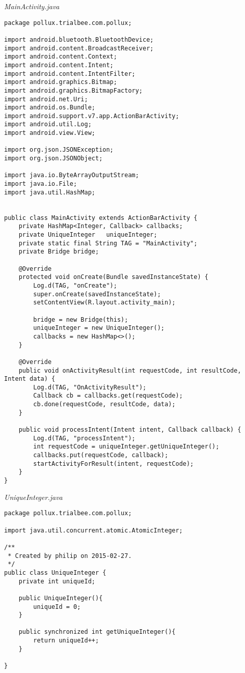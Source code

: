 \emph{MainActivity.java}
\begin{lstlisting}
package pollux.trialbee.com.pollux;

import android.bluetooth.BluetoothDevice;
import android.content.BroadcastReceiver;
import android.content.Context;
import android.content.Intent;
import android.content.IntentFilter;
import android.graphics.Bitmap;
import android.graphics.BitmapFactory;
import android.net.Uri;
import android.os.Bundle;
import android.support.v7.app.ActionBarActivity;
import android.util.Log;
import android.view.View;

import org.json.JSONException;
import org.json.JSONObject;

import java.io.ByteArrayOutputStream;
import java.io.File;
import java.util.HashMap;


public class MainActivity extends ActionBarActivity {
    private HashMap<Integer, Callback> callbacks;
    private UniqueInteger   uniqueInteger;
    private static final String TAG = "MainActivity";
    private Bridge bridge;

    @Override
    protected void onCreate(Bundle savedInstanceState) {
        Log.d(TAG, "onCreate");
        super.onCreate(savedInstanceState);
        setContentView(R.layout.activity_main);

        bridge = new Bridge(this);
        uniqueInteger = new UniqueInteger();
        callbacks = new HashMap<>();
    }

    @Override
    public void onActivityResult(int requestCode, int resultCode, Intent data) {
        Log.d(TAG, "OnActivityResult");
        Callback cb = callbacks.get(requestCode);
        cb.done(requestCode, resultCode, data);
    }

    public void processIntent(Intent intent, Callback callback) {
        Log.d(TAG, "processIntent");
        int requestCode = uniqueInteger.getUniqueInteger();
        callbacks.put(requestCode, callback);
        startActivityForResult(intent, requestCode);
    }
}
\end{lstlisting}
\emph{UniqueInteger.java}
\begin{lstlisting}
package pollux.trialbee.com.pollux;

import java.util.concurrent.atomic.AtomicInteger;

/**
 * Created by philip on 2015-02-27.
 */
public class UniqueInteger {
    private int uniqueId;

    public UniqueInteger(){
        uniqueId = 0;
    }

    public synchronized int getUniqueInteger(){
        return uniqueId++;
    }

}
\end{lstlisting}
